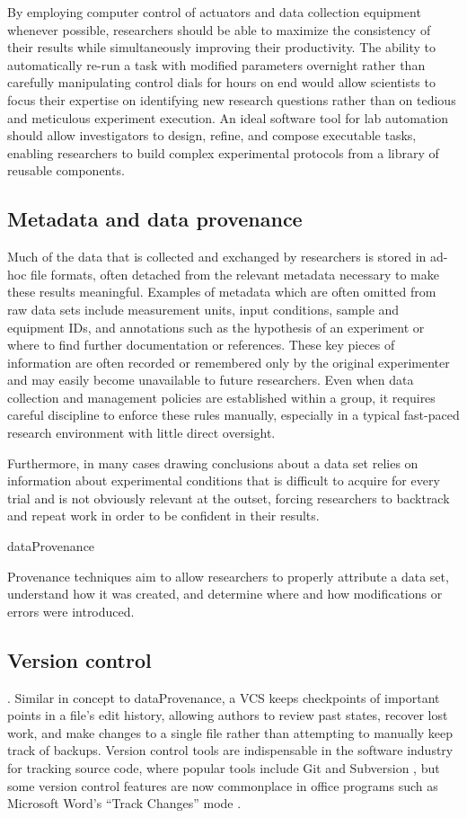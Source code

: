 \documentclass[../thesis]{subfiles}
\begin{document}
By employing computer control of actuators and data collection
equipment whenever possible, researchers should be able to maximize
the consistency of their results while simultaneously
improving their productivity. The ability to automatically re-run a
task with modified parameters overnight rather than carefully
manipulating control dials for hours on end would allow scientists
to focus their expertise on identifying new research questions rather
than on tedious and meticulous experiment execution.
An ideal software tool for lab automation should allow investigators
to design, refine, and compose executable tasks, enabling researchers
to build complex experimental protocols from a library of reusable
components.

\subsection{Metadata and data provenance}
Much of the data that is collected and exchanged by researchers is
stored in ad-hoc file formats, often detached from the relevant
metadata necessary to make these results meaningful. Examples of
metadata which are often omitted from raw data sets include
measurement units, input conditions, sample and equipment IDs, and
annotations such as the hypothesis of an experiment or where to find
further documentation or references. These key pieces of information
are often recorded or remembered only by the original experimenter and
may easily become unavailable to future researchers.
Even when data collection and management policies are established within
a group, it requires careful discipline to enforce these
rules manually, especially in a typical fast-paced research
environment with little direct oversight.

Furthermore, in many cases drawing conclusions about a data set relies on
information about experimental conditions that is
difficult to acquire for every trial and is not obviously
relevant at the outset, forcing researchers to backtrack and repeat
work in order to be confident in their results.

\gls{dataProvenance}

Provenance techniques aim to allow researchers to properly attribute a
data set, understand how it was created, and determine where and how
modifications or errors were introduced.

\subsection{Version control}
. Similar in concept to \gls{dataProvenance}, a \gls{VCS}
keeps checkpoints of important points in a file's edit history,
allowing authors to review past states, recover lost work, and make
changes to a single file rather than attempting to manually keep track
of backups. Version control tools are indispensable in the software
industry for tracking source code, where popular tools include Git
\cite{Git} and Subversion \cite{Subversion}, but some version control features are
now commonplace in office programs such as Microsoft Word's ``Track
Changes'' mode \cite{Word}.
\end{document}

